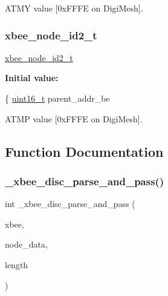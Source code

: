 A\+T\+MY value \mbox{[}0x\+F\+F\+FE on Digi\+Mesh\mbox{]}. 

\mbox{\label{group__xbee__discovery_ga4c7c2f1049e4dc4bb4552269077cf4fc}} 
\subsubsection{\texorpdfstring{xbee\+\_\+node\+\_\+id2\+\_\+t}{xbee\_node\_id2\_t}}
{\footnotesize\ttfamily \hyperlink{group__xbee__discovery_ga4c7c2f1049e4dc4bb4552269077cf4fc}{xbee\+\_\+node\+\_\+id2\+\_\+t}}

{\bfseries Initial value\+:}
\begin{DoxyCode}
\{
   \hyperlink{group__hal__dos_ga5a8b2dc9e45a9ee81a94ef304fb62505}{uint16\_t}        parent\_addr\_be
\end{DoxyCode}


A\+T\+MP value \mbox{[}0x\+F\+F\+FE on Digi\+Mesh\mbox{]}. 



\subsection{Function Documentation}
\mbox{\label{group__xbee__discovery_ga8db9bd798e5fb2f6c75037e0e9d3faff}} 
\subsubsection{\texorpdfstring{\+\_\+xbee\+\_\+disc\+\_\+parse\+\_\+and\+\_\+pass()}{\_xbee\_disc\_parse\_and\_pass()}}
{\footnotesize\ttfamily int \+\_\+xbee\+\_\+disc\+\_\+parse\+\_\+and\+\_\+pass (\begin{DoxyParamCaption}\item[{\hyperlink{structxbee__dev__t}{xbee\+\_\+dev\+\_\+t} $\ast$}]{xbee,  }\item[{const void \hyperlink{group__hal_gaef060b3456fdcc093a7210a762d5f2ed}{F\+AR} $\ast$}]{node\+\_\+data,  }\item[{int}]{length }\end{DoxyParamCaption})}



